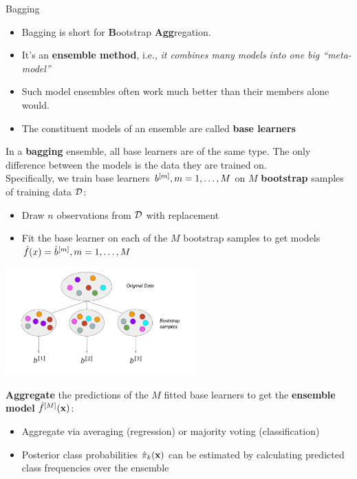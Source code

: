 \documentclass[11pt,compress,t,notes=noshow, xcolor=table]{beamer}
\begin{document}
\begin{vbframe}{Bagging}

\begin{itemize}
  \item Bagging is short for \textbf{B}ootstrap \textbf{Agg}regation.
  \item It's an \textbf{ensemble method}, i.e., \textit{it combines many models into one 
        big \enquote{meta-model}}
  \item Such model ensembles often work much better than their members alone would.
  \item The constituent models of an ensemble are called \textbf{base learners} 
\end{itemize}

\framebreak 
In a \textbf{bagging} ensemble, all base learners are of the same type. The only difference between the models is the data they are trained on.\\
Specifically, we train base learners $b^{[m]}, m = 1, \dots, M$ on $M$ \textbf{bootstrap} samples of training data $\mathcal{D}$:
\begin{itemize}
  \item Draw $n$ observations from $\mathcal{D}$ with replacement
  \item Fit the base learner on each of the $M$ bootstrap samples to get models $\hat{f}(x) = \hat{b}^{[m]}, m = 1, \dots, M$
\end{itemize}

\begin{center}
\includegraphics[width=0.55\textwidth]{figure_man/bagging.pdf}
\end{center}

\framebreak

\textbf{Aggregate} the predictions of the $M$ fitted base learners to get the
\textbf{ensemble model} $\hat f^{[M]}(\mathbf{x})$:
  \begin{itemize}
    \item Aggregate via averaging (regression) or majority voting (classification)
    \item Posterior class probabilities $\hat \pi_{k}(\mathbf{x})$ can be estimated by calculating predicted class frequencies over the ensemble
  \end{itemize}


\end{vbframe}
\end{document}
